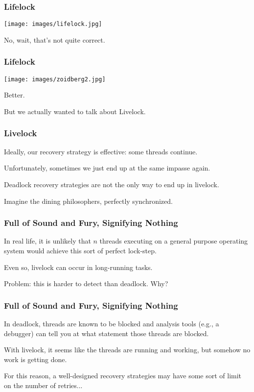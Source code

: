 \begin{frame}
\frametitle{Lifelock}

\begin{center}
	\texttt{[image: images/lifelock.jpg]}
\end{center}

No, wait, that's not quite correct.

\end{frame}


\begin{frame}
\frametitle{Lifelock}

\begin{center}
	\texttt{[image: images/zoidberg2.jpg]}
\end{center}

Better.

But we actually wanted to talk about Livelock.

\end{frame}


\begin{frame}
\frametitle{Livelock}

	Ideally, our recovery strategy is effective: some threads continue.
	
	Unfortunately, sometimes we just end up at the same impasse again.
	
	Deadlock recovery strategies are not the only way to end up in livelock.
	
	Imagine the dining philosophers, perfectly synchronized.

\end{frame}


\begin{frame}
\frametitle{Full of Sound and Fury, Signifying Nothing}

	In real life, it is unlikely that $n$ threads executing on a general purpose operating system would achieve this sort of perfect lock-step.
	
	Even so, livelock can occur in long-running tasks.

	Problem: this is harder to detect than deadlock. Why?
\end{frame}


\begin{frame}
\frametitle{Full of Sound and Fury, Signifying Nothing}

	In deadlock, threads are known to be blocked and analysis tools (e.g., a debugger) can tell you at what statement those threads are blocked.
	
	With livelock, it seems like the threads are running and working, but somehow no work is getting done. 

	For this reason, a well-designed recovery strategies may have some sort of limit on the number of retries...

\end{frame}





